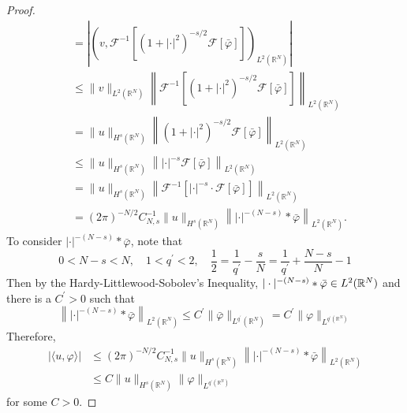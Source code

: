 \begin{proof}
\begin{equation*}
\begin{aligned}
			& =\left|\left(v, \mathcal{F}^{-1}\left[\left(1+|\cdot|^2\right)^{-s / 2} \mathcal{F}[\bar{\varphi}]\right]\right)_{L^2\left(\mathbb{R}^N\right)}\right| \\
			& \leq\|v\|_{L^2\left(\mathbb{R}^N\right)}\left\|\mathcal{F}^{-1}\left[\left(1+|\cdot|^2\right)^{-s / 2} \mathcal{F}[\bar{\varphi}]\right]\right\|_{L^2\left(\mathbb{R}^N\right)} \\
			& =\|u\|_{H^s\left(\mathbb{R}^N\right)}\left\|\left(1+|\cdot|^2\right)^{-s / 2} \mathcal{F}[\bar{\varphi}]\right\|_{L^2\left(\mathbb{R}^N\right)} \\
			& \leq\|u\|_{H^s\left(\mathbb{R}^N\right)}\left\||\cdot|^{-s} \mathcal{F}[\bar{\varphi}]\right\|_{L^2\left(\mathbb{R}^N\right)} \\
			& =\|u\|_{H^s\left(\mathbb{R}^N\right)}\left\|\mathcal{F}^{-1}\left[|\cdot|^{-s} \cdot \mathcal{F}[\bar{\varphi}]\right]\right\|_{L^2\left(\mathbb{R}^N\right)} \\
			& =(2 \pi)^{-N / 2} C_{N, s}^{-1}\|u\|_{H^s\left(\mathbb{R}^N\right)}\left\||\cdot|^{-(N-s)} * \bar{\varphi}\right\|_{L^2\left(\mathbb{R}^N\right)} .
		\end{aligned}
	\end{equation*}
	To consider $|\cdot|^{-(N-s)} * \bar{\varphi}$, note that
	\begin{equation*}
		0<N-s<N, \quad 1<q^{\prime}<2, \quad \frac{1}{2}=\frac{1}{q^{\prime}}-\frac{s}{N}=\frac{1}{q^{\prime}}+\frac{N-s}{N}-1
	\end{equation*}
	Then by the Hardy-Littlewood-Sobolev's Inequality, $|\cdot|^{-(N-s)} * \bar{\varphi} \in L^2(\mathbb{R}^N)$ and there is a $C^\prime > 0$ such that
	\begin{equation*}
		\left\||\cdot|^{-(N-s)} * \bar{\varphi}\right\|_{L^2\left(\mathbb{R}^N\right)} \leq C^{\prime}\|\bar{\varphi}\|_{L^{q^{\prime}}\left(\mathbb{R}^N\right)}=C^{\prime}\|\varphi\|_{L^{q^{\prime}\left(\mathbb{R}^N\right)}}
	\end{equation*}
	Therefore,
	\begin{equation*}
		\begin{aligned}
			|\langle u, \varphi\rangle| & \leq(2 \pi)^{-N / 2} C_{N, s}^{-1}\|u\|_{H^s\left(\mathbb{R}^N\right)}\left\||\cdot|^{-(N-s)} * \bar{\varphi}\right\|_{L^2\left(\mathbb{R}^N\right)} \\
			& \leq C\|u\|_{H^s\left(\mathbb{R}^N\right)}\|\varphi\|_{L^{q^{\prime}\left(\mathbb{R}^N\right)}}
		\end{aligned}
	\end{equation*}
	for some $C > 0$.


\end{proof}
